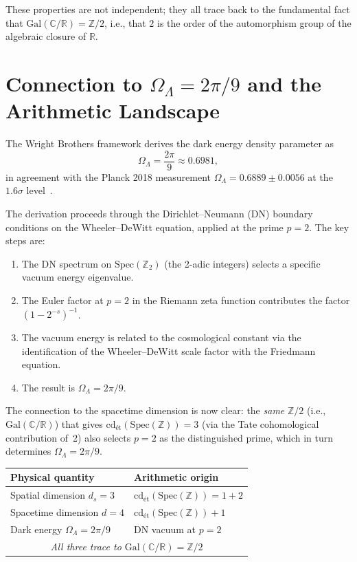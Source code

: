 \documentclass[12pt,a4paper]{article}
\theoremstyle{definition}
\newcommand{\Spec}{\mathrm{Spec}}
\newcommand{\Gal}{\mathrm{Gal}}
\newcommand{\cd}{\mathrm{cd}}
\newcommand{\ZZ}{\mathbb{Z}}
\newcommand{\RR}{\mathbb{R}}
\newcommand{\CC}{\mathbb{C}}
\begin{document}
These properties are not independent; they all trace back to the fundamental fact that
$\Gal(\CC/\RR) = \ZZ/2$, i.e., that $2$ is the order of the automorphism group of the
algebraic closure of $\RR$.

\section{Connection to $\Omega_\Lambda = 2\pi/9$ and the Arithmetic Landscape}\label{sec:omega}

The Wright Brothers framework derives the dark energy density parameter as
\[
  \Omega_\Lambda = \frac{2\pi}{9} \approx 0.6981,
\]
in agreement with the Planck 2018 measurement $\Omega_\Lambda = 0.6889 \pm 0.0056$
at the $1.6\sigma$ level~\cite{Planck2018}.

The derivation proceeds through the Dirichlet--Neumann (DN) boundary conditions
on the Wheeler--DeWitt equation, applied at the prime $p=2$. The key steps are:

\begin{enumerate}
  \item The DN spectrum on $\Spec(\ZZ_2)$ (the 2-adic integers) selects a specific
    vacuum energy eigenvalue.
  \item The Euler factor at $p=2$ in the Riemann zeta function contributes the
    factor $(1 - 2^{-s})^{-1}$.
  \item The vacuum energy is related to the cosmological constant via the
    identification of the Wheeler--DeWitt scale factor with the Friedmann equation.
  \item The result is $\Omega_\Lambda = 2\pi/9$.
\end{enumerate}

The connection to the spacetime dimension is now clear: the \emph{same} $\ZZ/2$
(i.e., $\Gal(\CC/\RR)$) that gives $\cd_{\text{\'et}}(\Spec(\ZZ)) = 3$ (via the
Tate cohomological contribution of~2) also selects $p=2$ as the distinguished prime,
which in turn determines $\Omega_\Lambda = 2\pi/9$.

\begin{center}
\begin{tabular}{ll}
\toprule
\textbf{Physical quantity} & \textbf{Arithmetic origin} \\
\midrule
Spatial dimension $d_s = 3$ & $\cd_{\text{\'et}}(\Spec(\ZZ)) = 1 + 2$ \\
Spacetime dimension $d = 4$ & $\cd_{\text{\'et}}(\Spec(\ZZ)) + 1$ \\
Dark energy $\Omega_\Lambda = 2\pi/9$ & DN vacuum at $p=2$ \\
\midrule
\multicolumn{2}{c}{\textit{All three trace to $\Gal(\CC/\RR) = \ZZ/2$}} \\
\bottomrule
\end{tabular}
\end{center}
\end{document}
